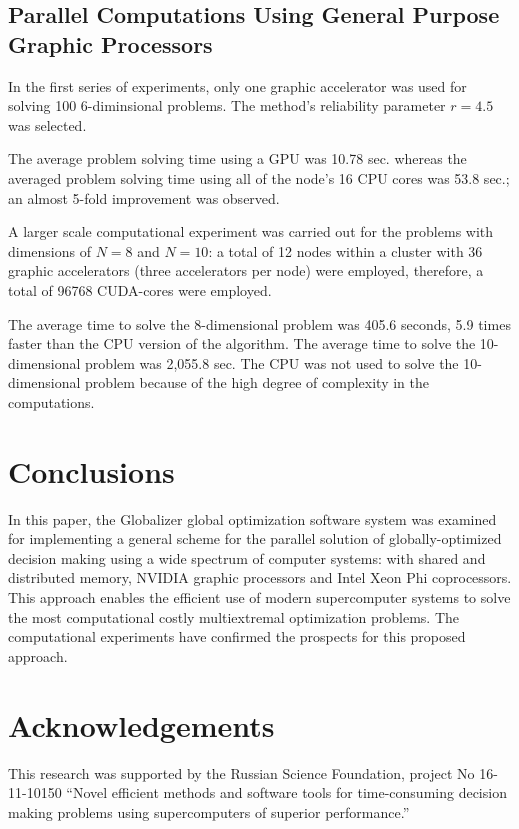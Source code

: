 \documentclass{gOMS2e}
\theoremstyle{plain}%
\theoremstyle{definition}
\theoremstyle{remark}
\begin{document}
\subsection{Parallel Computations Using General Purpose Graphic Processors}
In the first series of experiments, only one graphic accelerator was used for solving
100 6-diminsional problems. The method’s reliability parameter \(r=4.5\) was selected.
\par
The average problem solving time using a GPU was 10.78 sec. whereas the averaged problem
solving time using all of the node’s 16 CPU cores was 53.8 sec.; an almost 5-fold improvement was observed.
\par
A larger scale computational experiment was carried out for the problems with
dimensions of \(N=8\) and \(N=10\): a total of 12 nodes within a cluster with 36
graphic accelerators (three accelerators per node) were employed, therefore, a total
of 96768 CUDA-cores were employed.
\par
The average time to solve the 8-dimensional problem was 405.6 seconds, 5.9 times
faster than the CPU version of the algorithm. The average time to solve the
10-dimensional problem was 2,055.8 sec. The CPU was not used to solve the 10-dimensional
problem because of the high degree of complexity in the computations.

\section{Conclusions}
\label{sec:concl}
In this paper, the Globalizer global optimization software system was examined for
implementing a general scheme for the parallel solution of globally-optimized decision
making using a wide spectrum of computer systems: with shared and distributed memory,
NVIDIA graphic processors and Intel Xeon Phi coprocessors. This approach enables the
efficient use of modern supercomputer systems to solve the most computational costly
multiextremal optimization problems. The computational experiments have confirmed the
prospects for this proposed approach.

\section*{Acknowledgements}
This research was supported by the Russian Science Foundation, project No 16-11-10150
``Novel efficient methods and software tools for time-consuming decision making problems using supercomputers of superior performance.''



\end{document}

